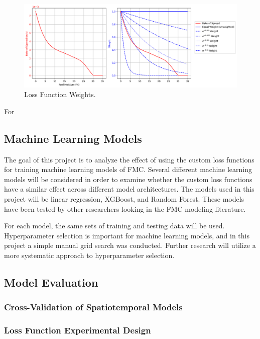 \documentclass[11pt]{article}%
\begin{document}
\begin{figure}[ht]
    \centering
    \includegraphics[width=1.1\textwidth]{images/weights.png}
    \caption{Loss Function Weights.}
    \label{fig:weights}
\end{figure}

For 

\subsection{Machine Learning Models}

The goal of this project is to analyze the effect of using the custom loss functions for training machine learning models of FMC. Several different machine learning models will be considered in order to examine whether the custom loss functions have a similar effect across different model architectures. The models used in this project will be linear regression, XGBoost, and Random Forest. These models have been tested by other researchers looking in the FMC modeling literature. \cite{Lee-2020-EFM,McCandless-2020-EWS, Schreck-2023-MLV}



For each model, the same sets of training and testing data will be used. Hyperparameter selection is important for machine learning models, and in this project a simple manual grid search was conducted. Further research will utilize a more systematic approach to hyperparameter selection.

\subsection{Model Evaluation}
\subsubsection{Cross-Validation of Spatiotemporal Models}
\subsubsection{Loss Function Experimental Design}
\end{document}
